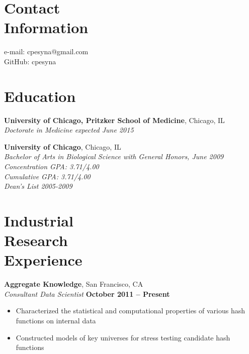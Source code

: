 \documentclass[margin,line]{resume}
\begin{document}
\begin{resume}

    \section{\mysidestyle Contact\\Information}

    e-mail: cpesyna@gmail.com\\
    GitHub: cpesyna \vspace{0mm}

    \section{\mysidestyle Education}
    \textbf{University of Chicago, Pritzker School of Medicine}, Chicago, IL\\%
    \textsl{Doctorate in Medicine expected June 2015}

    \textbf{University of Chicago}, Chicago, IL\\%
    \textsl{Bachelor of Arts in Biological Science with General Honors, June 2009}\\%
    \textsl{Concentration GPA: 3.71/4.00} \\
    \textsl{Cumulative GPA: 3.71/4.00} \\
    \textsl{Dean's List 2005-2009}
    \section{\mysidestyle Industrial\\Research\\Experience}
    \textbf{Aggregate Knowledge}, San Francisco, CA\\\vspace{1mm}
    \textsl{Consultant Data Scientist} \hfill \textbf{October 2011 -- Present}
    \begin{itemize}
    \item Characterized the statistical and computational properties of various hash functions on internal data
    \item Constructed models of key universes for stress testing candidate hash functions
    \end{itemize}


\end{resume}
\end{document}

